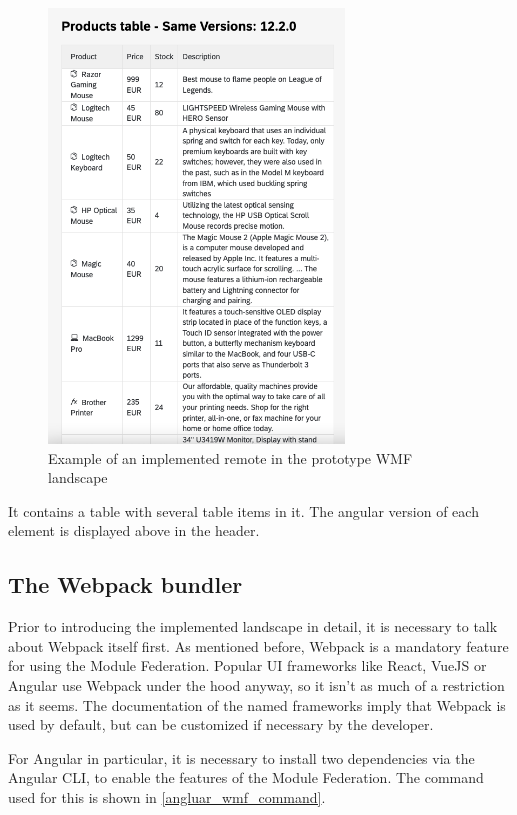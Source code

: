 \begin{figure}[!h]
	\centering
	\includegraphics[width=0.7\textwidth]{Figures/WMF_SameVersions.png}
	\caption{Example of an implemented remote in the prototype WMF landscape}
	\label{fig:wmf_screenshot}
\end{figure}

It contains a table with several table items in it. The angular version of each element is displayed above in the header.

 \subsection{The Webpack bundler}
 
Prior to introducing the implemented landscape in detail, it is necessary to talk about Webpack itself first. As mentioned before, Webpack is a mandatory feature for using the Module Federation. Popular UI frameworks like React, VueJS or Angular use Webpack under the hood anyway, so it isn't as much of a restriction as it seems.\cite{webpack_angular}\cite{webpack_react}\cite{webpack_vue}
The documentation of the named frameworks imply that Webpack is used by default, but can be customized if necessary by the developer.

For Angular in particular, it is necessary to install two dependencies via the Angular CLI, to enable the features of the Module Federation. The command used for this is shown in \ref{angluar_wmf_command}. 

